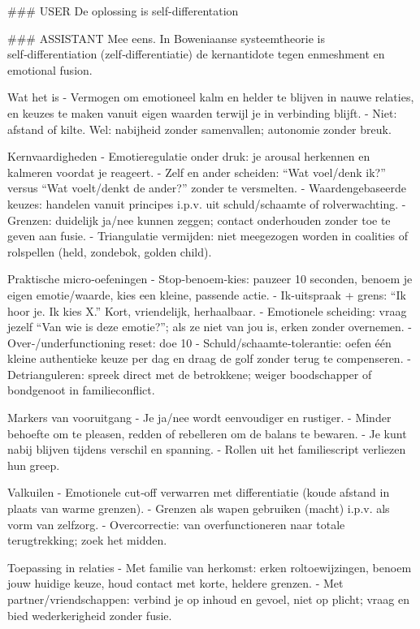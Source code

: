 \#\#\# USER
De oplossing is self-differentation

\#\#\# ASSISTANT
Mee eens. In Boweniaanse systeemtheorie is self‑differentiation (zelf‑differentiatie) de kernantidote tegen enmeshment en emotional fusion.

Wat het is
- Vermogen om emotioneel kalm en helder te blijven in nauwe relaties, en keuzes te maken vanuit eigen waarden terwijl je in verbinding blijft.
- Niet: afstand of kilte. Wel: nabijheid zonder samenvallen; autonomie zonder breuk.

Kernvaardigheden
- Emotieregulatie onder druk: je arousal herkennen en kalmeren voordat je reageert.
- Zelf en ander scheiden: “Wat voel/denk ik?” versus “Wat voelt/denkt de ander?” zonder te versmelten.
- Waardengebaseerde keuzes: handelen vanuit principes i.p.v. uit schuld/schaamte of rolverwachting.
- Grenzen: duidelijk ja/nee kunnen zeggen; contact onderhouden zonder toe te geven aan fusie.
- Triangulatie vermijden: niet meegezogen worden in coalities of rolspellen (held, zondebok, golden child).

Praktische micro‑oefeningen
- Stop‑benoem‑kies: pauzeer 10 seconden, benoem je eigen emotie/waarde, kies een kleine, passende actie.
- Ik‑uitspraak + grens: “Ik hoor je. Ik kies X.” Kort, vriendelijk, herhaalbaar.
- Emotionele scheiding: vraag jezelf “Van wie is deze emotie?”; als ze niet van jou is, erken zonder overnemen.
- Over‑/underfunctioning reset: doe 10 %
- Schuld/schaamte‑tolerantie: oefen één kleine authentieke keuze per dag en draag de golf zonder terug te compenseren.
- Detrianguleren: spreek direct met de betrokkene; weiger boodschapper of bondgenoot in familieconflict.

Markers van vooruitgang
- Je ja/nee wordt eenvoudiger en rustiger.
- Minder behoefte om te pleasen, redden of rebelleren om de balans te bewaren.
- Je kunt nabij blijven tijdens verschil en spanning.
- Rollen uit het familiescript verliezen hun greep.

Valkuilen
- Emotionele cut‑off verwarren met differentiatie (koude afstand in plaats van warme grenzen).
- Grenzen als wapen gebruiken (macht) i.p.v. als vorm van zelfzorg.
- Overcorrectie: van overfunctioneren naar totale terugtrekking; zoek het midden.

Toepassing in relaties
- Met familie van herkomst: erken roltoewijzingen, benoem jouw huidige keuze, houd contact met korte, heldere grenzen.
- Met partner/vriendschappen: verbind je op inhoud en gevoel, niet op plicht; vraag en bied wederkerigheid zonder fusie.

